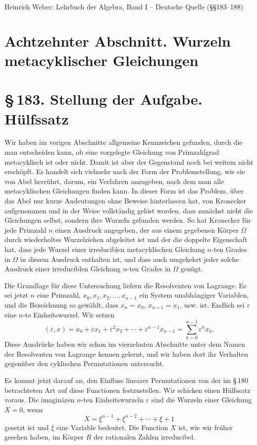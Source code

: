 \documentclass[11pt]{article}
\providecommand{\sect}[2]{\section*{\S\,#1. #2}}
\begin{document}
\begin{center}\Large Heinrich Weber: Lehrbuch der Algebra, Band I -- Deutsche Quelle (\S\S 183--188)\end{center}
\bigskip
\section*{Achtzehnter Abschnitt. Wurzeln metacyklischer Gleichungen}

\sect{183}{Stellung der Aufgabe. H\"ulfssatz}

Wir haben im vorigen Abschnitte allgemeine Kennzeichen gefunden, durch die man entscheiden kann, ob eine vorgelegte Gleichung von Primzahlgrad metacyklisch ist oder nicht. Damit ist aber der Gegenstand noch bei weitem nicht ersch\"opft. Es handelt sich vielmehr nach der Form der Problemstellung, wie sie von Abel herr\"uhrt, darum, ein Verfahren anzugeben, nach dem man alle metacyklischen Gleichungen finden kann. In dieser Form ist das Problem, \"uber das Abel nur kurze Andeutungen ohne Beweise hinterlassen hat, von Kronecker aufgenommen und in der Weise vollst\"andig gel\"ost worden, dass zun\"achst nicht die Gleichungen selbst, sondern ihre Wurzeln gefunden werden. So hat Kronecker f\"ur jede Primzahl $n$ einen Ausdruck angegeben, der aus einem gegebenen K\"orper $\Omega$ durch wiederholtes Wurzelziehen abgeleitet ist und der die doppelte Eigenschaft hat, dass jede Wurzel einer irreduciblen metacyklischen Gleichung $n$-ten Grades in $\Omega$ in diesem Ausdruck enthalten ist, und dass auch umgekehrt jeder solche Ausdruck einer irreduciblen Gleichung $n$-ten Grades in $\Omega$ gen\"ugt.

Die Grundlage f\"ur diese Untersuchung liefern die Resolventen von Lagrange. Es sei jetzt $n$ eine Primzahl, $x_0,x_1,x_2,\ldots,x_{n-1}$ ein System unabh\"angiger Variablen, und die Bezeichnung so gew\"ahlt, dass $x_n=x_0$, $x_{n+1}=x_1$, usw. ist. Endlich sei $\varepsilon$ eine $n$-te Einheitswurzel. Wir setzen
\begin{equation}\tag{1}
  (\varepsilon,x)=x_0+\varepsilon x_1+\varepsilon^2x_2+\cdots+\varepsilon^{n-1}x_{n-1}
  =\sum_{h=0}^{n-1}\varepsilon^h x_h .
\end{equation}
Diese Ausdr\"ucke haben wir schon im vierzehnten Abschnitte unter dem Namen der Resolventen von Lagrange kennen gelernt, und wir haben dort ihr Verhalten gegen\"uber den cyklischen Permutationen untersucht.

Es kommt jetzt darauf an, den Einfluss linearer Permutationen von der im \S\,180 betrachteten Art auf diese Functionen festzustellen. Wir schicken einen H\"ulfssatz voraus. Die imagin\"aren $n$-ten Einheitswurzeln $\varepsilon$ sind die Wurzeln einer Gleichung $X=0$, wenn
\begin{equation}\tag{2}
  X=\xi^{n-1}+\xi^{n-2}+\cdots+\xi+1
\end{equation}
gesetzt ist und $\xi$ eine Variable bedeutet. Die Function $X$ ist, wie wir fr\"uher gesehen haben, im K\"orper $R$ der rationalen Zahlen irreducibel.
\end{document}

